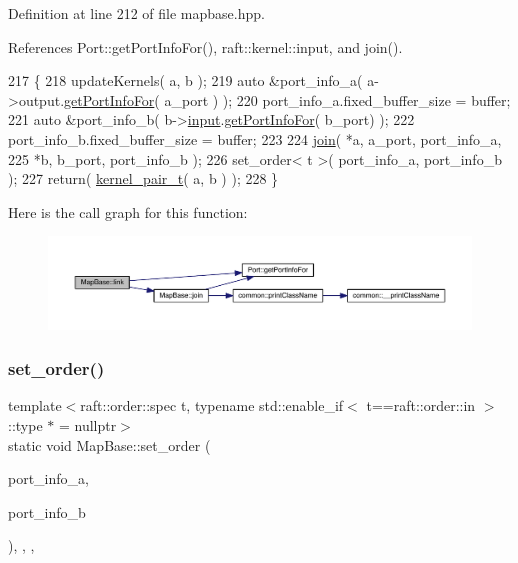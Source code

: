 Definition at line 212 of file mapbase.\+hpp.



References Port\+::get\+Port\+Info\+For(), raft\+::kernel\+::input, and join().


\begin{DoxyCode}
217    \{
218       updateKernels( a, b );
219       \textcolor{keyword}{auto} &port\_info\_a( a->output.\hyperlink{class_port_afb426a015195fa9b4b5b1d1200daf8ed}{getPortInfoFor}( a\_port ) );
220       port\_info\_a.fixed\_buffer\_size = buffer;
221       \textcolor{keyword}{auto} &port\_info\_b( b->\hyperlink{classraft_1_1kernel_a6edbe35a56409d402e719b3ac36d6554}{input}.\hyperlink{class_port_afb426a015195fa9b4b5b1d1200daf8ed}{getPortInfoFor}( b\_port) );
222       port\_info\_b.fixed\_buffer\_size = buffer;
223       
224       \hyperlink{class_map_base_a2624d7b81f0078dcc78e524045403e28}{join}( *a, a\_port, port\_info\_a, 
225             *b, b\_port, port\_info\_b );
226       set\_order< t >( port\_info\_a, port\_info\_b ); 
227       \textcolor{keywordflow}{return}( \hyperlink{classkernel__pair__t}{kernel\_pair\_t}( a, b ) );
228    \}
\end{DoxyCode}
Here is the call graph for this function\+:
\nopagebreak
\begin{figure}[H]
\begin{center}
\leavevmode
\includegraphics[width=350pt]{class_map_base_af06481b99a96e3c5ae8da88cc8a78e91_cgraph}
\end{center}
\end{figure}
\hypertarget{class_map_base_ab2bdd75e5f2f7a84ec7146625f85dbde}{}\label{class_map_base_ab2bdd75e5f2f7a84ec7146625f85dbde} 
\subsubsection{\texorpdfstring{set\+\_\+order()}{set\_order()}\hspace{0.1cm}{\footnotesize\ttfamily [1/2]}}
{\footnotesize\ttfamily template$<$raft\+::order\+::spec t, typename std\+::enable\+\_\+if$<$ t==raft\+::order\+::in $>$\+::type $\ast$  = nullptr$>$ \\
static void Map\+Base\+::set\+\_\+order (\begin{DoxyParamCaption}\item[{\hyperlink{struct_port_info}{Port\+Info} \&}]{port\+\_\+info\+\_\+a,  }\item[{\hyperlink{struct_port_info}{Port\+Info} \&}]{port\+\_\+info\+\_\+b }\end{DoxyParamCaption})\hspace{0.3cm}{\ttfamily [inline]}, {\ttfamily [static]}, {\ttfamily [protected]}, {\ttfamily [noexcept]}}

